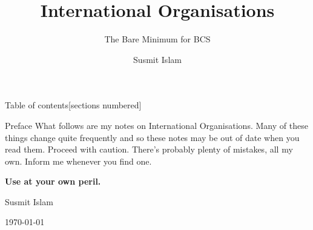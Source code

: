 \documentclass[
  12pt,
  ignorenonframetext,
  progressbar=frametitle]{beamer}
\title{International Organisations}
\subtitle{The Bare Minimum for BCS}
\author{Susmit Islam}
\date{}
\institute{Sir Salimullah Medical College}
\begin{document}
\frame{\titlepage}
\begin{frame}[t,allowframebreaks]
{Table of contents}[sections numbered]

\tableofcontents[hideallsubsections]
\end{frame}


\begin{frame}[allowframebreaks]
{Preface}
\protect\hypertarget{preface}{}
What follows are my notes on International Organisations. Many of these
things change quite frequently and so these notes may be out of date
when you read them. Proceed with caution. There's probably plenty of
mistakes, all my own. Inform me whenever you find one.\newline

\textbf{Use at your own peril.}

\hfill Susmit Islam

\hfill\today
\end{frame}
\end{document}
